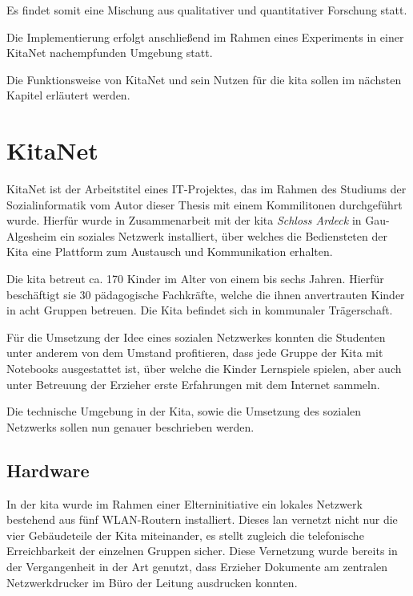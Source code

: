 Es findet somit eine Mischung aus qualitativer und quantitativer Forschung statt.

Die Implementierung erfolgt anschließend im Rahmen eines Experiments in einer KitaNet nachempfunden Umgebung statt.

Die Funktionsweise von KitaNet und sein Nutzen für die \ac{kita} sollen im nächsten Kapitel erläutert werden.

\chapter{KitaNet}


KitaNet ist der Arbeitstitel eines IT-Projektes, das im Rahmen des Studiums der Sozialinformatik vom Autor dieser Thesis mit einem Kommilitonen durchgeführt wurde. Hierfür wurde in Zusammenarbeit mit der \ac{kita} \textit{Schloss Ardeck} in Gau-Algesheim ein soziales Netzwerk installiert, über welches die Bediensteten der Kita eine Plattform zum Austausch und Kommunikation erhalten. 

Die \ac{kita} betreut ca. 170 Kinder im Alter von einem bis sechs Jahren. Hierfür beschäftigt sie 30 pädagogische Fachkräfte, welche die ihnen anvertrauten Kinder in acht Gruppen betreuen. Die Kita befindet sich in kommunaler Trägerschaft.

Für die Umsetzung der Idee eines sozialen Netzwerkes konnten die Studenten unter anderem von dem Umstand profitieren, dass jede Gruppe der Kita mit Notebooks ausgestattet ist, über welche die Kinder Lernspiele spielen, aber auch unter Betreuung der Erzieher erste Erfahrungen mit dem Internet sammeln.

Die technische Umgebung in der Kita, sowie die Umsetzung des sozialen Netzwerks sollen nun genauer beschrieben werden. 

\section{Hardware}
In der \ac{kita} wurde im Rahmen einer Elterninitiative ein lokales Netzwerk bestehend aus fünf WLAN-Routern installiert. Dieses \ac{lan} vernetzt nicht nur die vier Gebäudeteile der Kita miteinander, es stellt zugleich die telefonische Erreichbarkeit der einzelnen Gruppen sicher. Diese Vernetzung wurde bereits in der Vergangenheit in der Art genutzt, dass Erzieher Dokumente am zentralen Netzwerkdrucker im Büro der Leitung ausdrucken konnten.

